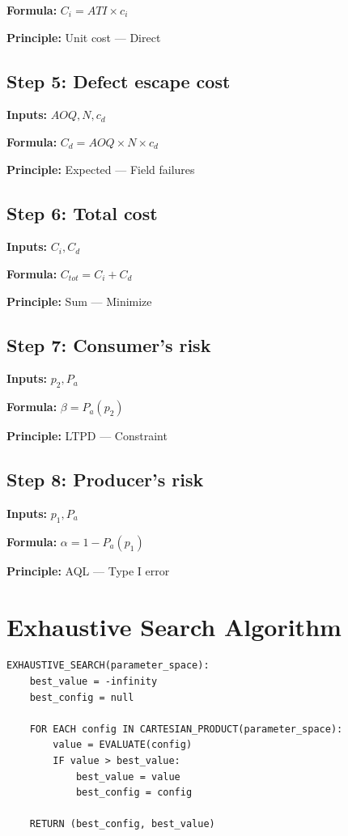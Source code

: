 \documentclass[11pt,twocolumn]{article}
\begin{document}
\textbf{Formula:} $C_i = ATI \times c_i$

\textbf{Principle:} Unit cost --- Direct

\subsection*{Step 5: Defect escape cost}
\textbf{Inputs:} $AOQ, N, c_d$

\textbf{Formula:} $C_d = AOQ \times N \times c_d$

\textbf{Principle:} Expected --- Field failures

\subsection*{Step 6: Total cost}
\textbf{Inputs:} $C_i, C_d$

\textbf{Formula:} $C_{tot} = C_i + C_d$

\textbf{Principle:} Sum --- Minimize

\subsection*{Step 7: Consumer's risk}
\textbf{Inputs:} $p_2, P_a$

\textbf{Formula:} $\beta = P_a(p_2)$

\textbf{Principle:} LTPD --- Constraint

\subsection*{Step 8: Producer's risk}
\textbf{Inputs:} $p_1, P_a$

\textbf{Formula:} $\alpha = 1 - P_a(p_1)$

\textbf{Principle:} AQL --- Type I error


\section{Exhaustive Search Algorithm}

\begin{verbatim}
EXHAUSTIVE_SEARCH(parameter_space):
    best_value = -infinity
    best_config = null
    
    FOR EACH config IN CARTESIAN_PRODUCT(parameter_space):
        value = EVALUATE(config)
        IF value > best_value:
            best_value = value
            best_config = config
    
    RETURN (best_config, best_value)
\end{verbatim}
\end{document}
